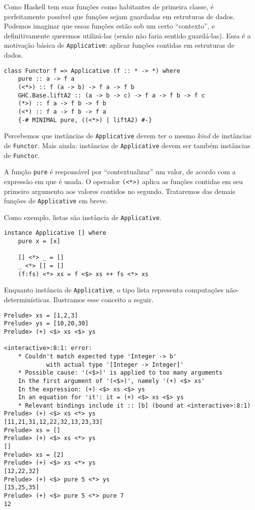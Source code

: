\documentclass[a4paper]{article}
\begin{document}
Como Haskell tem suas funções como habitantes de primeira classe, é perfeitamente possível que funções sejam guardadas em estruturas de dados.
Podemos imaginar que essas funções estão sob um certo ``contexto'', e definitivamente queremos utilizá-las (senão não faria sentido guardá-las).
Essa é a motivação básica de \texttt{Applicative}: aplicar funções contidas em estruturas de dados.

\begin{verbatim}
class Functor f => Applicative (f :: * -> *) where
	pure :: a -> f a
	(<*>) :: f (a -> b) -> f a -> f b
	GHC.Base.liftA2 :: (a -> b -> c) -> f a -> f b -> f c
	(*>) :: f a -> f b -> f b
	(<*) :: f a -> f b -> f a
	{-# MINIMAL pure, ((<*>) | liftA2) #-}
\end{verbatim}

Percebemos que instâncias de \texttt{Applicative} devem ter o mesmo \emph{kind} de instâncias de \texttt{Functor}.
Mais ainda: instâncias de \texttt{Applicative} devem ser também instâncias de \texttt{Functor}.

A função \texttt{pure} é responsável por ``contextualizar'' um valor, de acordo com a expressão em que é usada.
O operador \texttt{(<*>)} aplica as funções contidas em seu primeiro argumento aos valores contidos no segundo.
Trataremos das demais funções de \texttt{Applicative} em breve.

Como exemplo, listas são instância de \texttt{Applicative}.

\begin{verbatim}
instance Applicative [] where
	pure x = [x]
	
	[] <*> _ = []
	_ <*> [] = []
	(f:fs) <*> xs = f <$> xs ++ fs <*> xs
\end{verbatim}

Enquanto instância de \texttt{Applicative}, o tipo lista representa computações não-determinísticas.
Ilustramos esse conceito a seguir.

\pagebreak

\begin{verbatim}
Prelude> xs = [1,2,3]
Prelude> ys = [10,20,30]
Prelude> (+) <$> xs <$> ys

<interactive>:8:1: error:
	* Couldn't match expected type 'Integer -> b'
			with actual type '[Integer -> Integer]'
	* Possible cause: '(<$>)' is applied to too many arguments
	In the first argument of '(<$>)', namely '(+) <$> xs'
	In the expression: (+) <$> xs <$> ys
	In an equation for 'it': it = (+) <$> xs <$> ys
	* Relevant bindings include it :: [b] (bound at <interactive>:8:1)
Prelude> (+) <$> xs <*> ys
[11,21,31,12,22,32,13,23,33]
Prelude> xs = []
Prelude> (+) <$> xs <*> ys
[]
Prelude> xs = [2]
Prelude> (+) <$> xs <*> ys
[12,22,32]
Prelude> (+) <$> pure 5 <*> ys
[15,25,35]
Prelude> (+) <$> pure 5 <*> pure 7
12
\end{verbatim}
\end{document}
